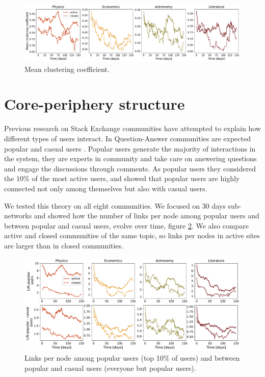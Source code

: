 \begin{figure}
	\centering
	\includegraphics[width=\linewidth]{figures/stackexchange/clustering.pdf}%
	\caption{Mean clustering coefficient.}
	\label{fig:clustering}
\end{figure}

\section{Core-periphery structure}

Previous research on Stack Exchange communities have attempted to explain how different types of users interact. In Question-Answer communities are expected popular and casual users \cite{santos2019activity, santos2019self}. Popular users generate the majority of interactions in the system, they are experts in community and take care on answering questions and engage the discussions through comments. As popular users they considered the $10 \%$ of the most active users, and showed that popular users are highly connected not only among themselves but also with casual users.

We tested this theory on all eight communities. We focused on 30 days sub-networks and showed how the number of links per node among popular users and between popular and casual users, evolve over time, figure \ref{fig:pop_cas_users}. We also compare active and closed communities of the same topic, so links per nodes in active sites are larger than in closed communities.

\begin{figure}[h!]
	\centering
	\includegraphics[width=\linewidth]{figures/stackexchange/popular_casual_users.pdf}
	\caption{Links per node among popular users (top 10\% of users) and between popular and casual users (everyone but popular users).}
	\label{fig:pop_cas_users}
\end{figure} 

